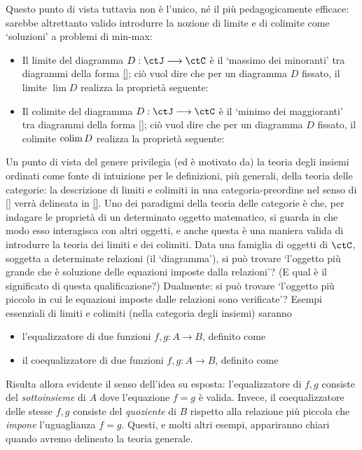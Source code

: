 Questo punto di vista tuttavia non è l'unico, né il più pedagogicamente efficace: sarebbe altrettanto valido introdurre la nozione di limite e di colimite come `soluzioni' a problemi di min-max: 
\begin{itemize}
	\item Il limite del diagramma $D : \ctJ\fun\ctC$ è il `massimo dei minoranti' tra diagrammi della forma \eqref{}; ciò vuol dire che per un diagramma $D$ fissato, il limite $\lim D$ realizza la proprietà seguente:
	\Todo{}
	\item Il colimite del diagramma $D : \ctJ\fun\ctC$ è il `minimo dei maggioranti' tra diagrammi della forma \eqref{}; ciò vuol dire che per un diagramma $D$ fissato, il colimite $\operatorname*{colim} D$ realizza la proprietà seguente:
	\Todo{}
\end{itemize}
Un punto di vista del genere privilegia (ed è motivato da) la teoria degli insiemi ordinati come fonte di intuizione per le definizioni, più generali, della teoria delle categorie: la descrizione di limiti e colimiti in una categoria-preordine nel senso di \ref{} verrà delineata in \ref{}.
\Todo{}
Uno dei paradigmi della teoria delle categorie è che, per indagare le proprietà di un determinato oggetto matematico, si guarda in che modo esso interagisca con  altri oggetti, e anche questa è una maniera valida di introdurre la teoria dei limiti e dei colimiti. Data una famiglia di oggetti di $\ctC$, soggetta a determinate relazioni (il `diagramma'), si può trovare `l'oggetto più grande che è soluzione delle equazioni imposte dalla relazioni'? (E qual è il significato di questa qualificazione?) Dualmente: si può trovare `l'oggetto più piccolo in cui le equazioni imposte dalle relazioni sono verificate'?
\Todo{}
Esempi essenziali di limiti e colimiti (nella categoria degli insiemi) saranno 
\begin{itemize}
	\item l'equalizzatore di due funzioni $f,g : A \to B$, definito come 
	\Todo{}
	\item il coequalizzatore di due funzioni $f,g : A \to B$, definito come 
	\Todo{}
\end{itemize}
Risulta allora evidente il senso dell'idea su esposta: l'equalizzatore di $f,g$ consiste del \emph{sottoinsieme} di $A$ dove l'equazione $f=g$ è valida. Invece, il coequalizzatore delle stesse $f,g$ consiste del \emph{quoziente} di $B$ rispetto alla relazione più piccola che \emph{impone} l'uguaglianza $f=g$.
\Todo{}
Questi, e molti altri esempi, appariranno chiari quando avremo delineato la teoria generale.
